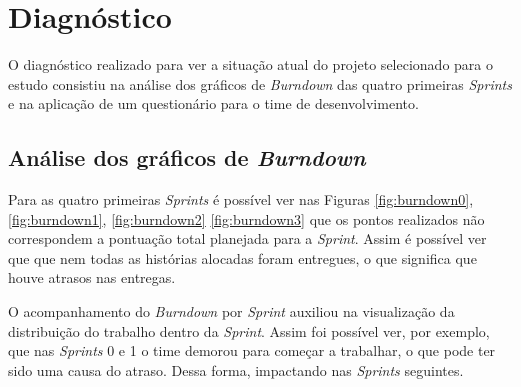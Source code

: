 	\pagebreak


\section{Diagnóstico}
	
	O diagnóstico realizado para ver a situação atual do projeto selecionado para o estudo consistiu na análise 
	dos gráficos de \textit{Burndown} das quatro primeiras \textit{Sprints} e na aplicação de um questionário para o 
	time de desenvolvimento.
	
	\subsection{Análise dos gráficos de \textit{Burndown}}

	Para as quatro primeiras \textit{Sprints} é possível ver nas Figuras \ref{fig:burndown0}, \ref{fig:burndown1}, \ref{fig:burndown2}
	\ref{fig:burndown3} que os pontos realizados não correspondem a pontuação total planejada para a \textit{Sprint}. 
	Assim é possível ver que que nem todas as histórias alocadas foram entregues, o que significa que houve atrasos nas entregas.

	O acompanhamento do \textit{Burndown} por \textit{Sprint} auxiliou na visualização da distribuição do trabalho dentro da \textit{Sprint}.
	Assim foi possível ver, por exemplo, que nas \textit{Sprints} 0 e 1 o time demorou para começar a trabalhar, o que pode ter sido uma causa do atraso. Dessa forma, impactando nas \textit{Sprints} seguintes.

